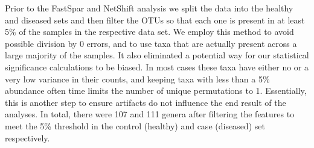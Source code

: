 

Prior to the \acrshort{FastSpar} and NetShift analysis we split the data into the healthy and diseased sets and then filter the \acrshort{OTU}s so that each one is present in at least 5\% of the samples in the respective data set. We employ this method to avoid possible division by 0 errors, and to use taxa that are actually present across a large majority of the samples. It also eliminated a potential way for our statistical significance calculations to be biased. In most cases these taxa have either no or a very low variance in their counts, and keeping taxa with less than a 5\% abundance often time limits the number of unique permutations to 1. Essentially, this is another step to ensure artifacts do not influence the end result of the analyses. In total, there were 107 and 111 genera after filtering the features to meet the 5\% threshold in the control (healthy) and case (diseased) set respectively.


